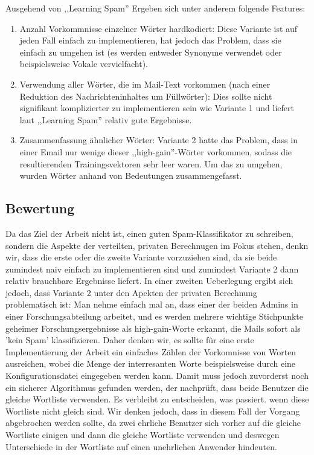 \documentclass[12pt]{article}
\begin{document}
Ausgehend von ,,Learning Spam'' Ergeben sich unter anderem folgende Features:
\begin{enumerate}
\item Anzahl Vorkommnisse einzelner W\"orter hardkodiert: Diese Variante ist auf
   jeden Fall einfach zu implementieren, hat jedoch das Problem, dass sie
   einfach zu umgehen ist (es werden entweder Synonyme verwendet oder
   beispielsweise Vokale vervielfacht).
\item Verwendung aller W\"orter, die im Mail-Text vorkommen (nach einer Reduktion
   des Nachrichteninhaltes um F\"ullw\"orter): Dies sollte nicht signifikant
   komplizierter zu implementieren sein wie Variante 1 und liefert laut
   ,,Learning Spam'' relativ gute Ergebnisse.
\item Zusammenfassung \"ahnlicher W\"orter: Variante 2 hatte das Problem, dass in
   einer Email nur wenige dieser ,,high-gain''-W\"orter vorkommen, sodass die
   resultierenden Trainingsvektoren sehr leer waren. Um das zu umgehen, wurden
   W\"orter anhand von Bedeutungen zusammengefasst.
\end{enumerate}

\subsection{Bewertung}
Da das Ziel der Arbeit nicht ist, einen guten Spam-Klassifikator zu schreiben,
sondern die Aspekte der verteilten, privaten Berechnugen im Fokus stehen, denkn
wir, dass die erste oder die zweite Variante vorzuziehen sind, da sie beide
zumindest naiv einfach zu implementieren sind und zumindest Variante 2
dann relativ brauchbare Ergebnisse liefert.
In einer zweiten Ueberlegung ergibt sich jedoch, dass Variante 2 unter den
Apekten der privaten Berechnung problematisch ist: Man nehme einfach mal an,
dass einer der beiden Admins in einer Forschungsabteilung arbeitet, und es
werden mehrere wichtige Stichpunkte geheimer Forschungsergebnisse als
high-gain-Worte erkannt, die Mails sofort als 'kein Spam' klassifizieren. Daher
denken wir, es sollte f\"ur eine erste Implementierung der Arbeit ein einfaches
Z\"ahlen der Vorkomnisse von Worten ausreichen, wobei die Menge der interresanten 
Worte beispielsweise durch eine Konfigurationsdatei eingegeben werden kann.
Damit muss jedoch zuvorderst noch ein sicherer Algorithmus gefunden werden, der
nachpr\"uft, dass beide Benutzer die gleiche Wortliste verwenden. Es verbleibt
zu entscheiden, was passiert. wenn diese Wortliste nicht gleich sind. Wir denken
jedoch, dass in diesem Fall der Vorgang abgebrochen werden sollte, da zwei
ehrliche Benutzer sich vorher auf die gleiche Wortliste einigen und dann die
gleiche Wortliste verwenden und deswegen Unterschiede in der Wortliste auf einen
unehrlichen Anwender hindeuten.
\end{document}
